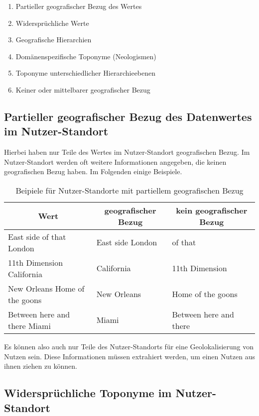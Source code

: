 		\begin{enumerate}	
		 	\item Partieller geografischer Bezug des Wertes
		 	\item Widersprüchliche Werte 
		 	\item Geografische Hierarchien
		 	\item Domänenspezifische Toponyme (Neologismen)
		 	\item Toponyme unterschiedlicher Hierarchieebenen
		 	\item Keiner oder mittelbarer geografischer Bezug
		\end{enumerate}	 

		\subsection{Partieller geografischer Bezug des Datenwertes im Nutzer-Standort} \label{sub:partiellerGeografischerBezug} 

			Hierbei haben nur Teile des Wertes im Nutzer-Standort geografischen Bezug. 
			Im Nutzer-Standort werden oft weitere Informationen angegeben, die keinen geografischen Bezug haben. 
			Im Folgenden einige Beispiele.

			\begin{table}[h]
				\centering
				\caption{Beipiele für Nutzer-Standorte mit partiellem geografischen Bezug}
				\label{tab:partiellerGeogrBezug}
				\begin{tabular}{|l|l|l|}
				\hline
				\multicolumn{1}{|c|}{Wert} & \multicolumn{1}{c|}{geografischer Bezug} & \multicolumn{1}{c|}{kein geografischer Bezug} \\ \hline
				East side of that London & East side London & of that \\ \hline
				11th Dimension California & California & 11th Dimension \\ \hline
				New Orleans Home of the goons & New Orleans & Home of the goons \\ \hline
				Between here and there Miami & Miami & Between here and there \\ \hline
				\end{tabular}
			\end{table}
			
			Es können also auch nur Teile des Nutzer-Standorts für eine Geolokalisierung von Nutzen sein.
			Diese Informationen müssen extrahiert werden, um einen Nutzen aus ihnen ziehen zu können. 

		\subsection{Widersprüchliche Toponyme im Nutzer-Standort} \label{sub:wiederspruechlicheBezuege} 

